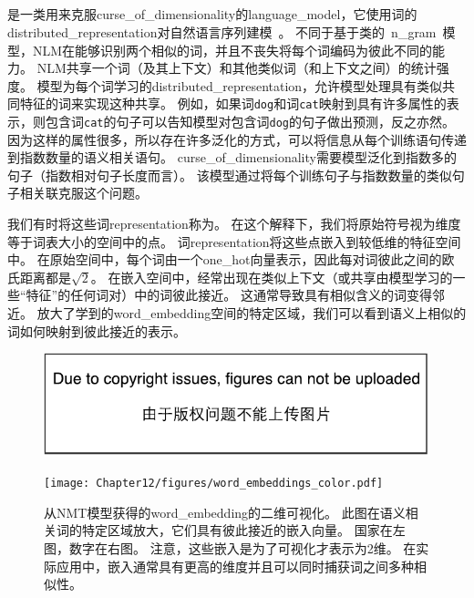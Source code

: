 \subsection{}
\label{sec:neural_language_models}

是一类用来克服\gls{curse_of_dimensionality}的\gls{language_model}，它使用词的\gls{distributed_representation}对自然语言序列建模~\citep{BenDucVin01-small}。
不同于基于类的~\gls{n_gram}~模型，\gls{NLM}在能够识别两个相似的词，并且不丧失将每个词编码为彼此不同的能力。
\gls{NLM}共享一个词（及其上下文）和其他类似词（和上下文之间）的统计强度。
模型为每个词学习的\gls{distributed_representation}，允许模型处理具有类似共同特征的词来实现这种共享。
例如，如果词{\tt dog}和词{\tt cat}映射到具有许多属性的表示，则包含词{\tt cat}的句子可以告知模型对包含词{\tt dog}的句子做出预测，反之亦然。
因为这样的属性很多，所以存在许多泛化的方式，可以将信息从每个训练语句传递到指数数量的语义相关语句。
\gls{curse_of_dimensionality}需要模型泛化到指数多的句子（指数相对句子长度而言）。
该模型通过将每个训练句子与指数数量的类似句子相关联克服这个问题。


我们有时将这些词\gls{representation}称为。
在这个解释下，我们将原始符号视为维度等于词表大小的空间中的点。
词\gls{representation}将这些点嵌入到较低维的特征空间中。
在原始空间中，每个词由一个\gls{one_hot}向量表示，因此每对词彼此之间的欧氏距离都是$\sqrt{2}$。
在嵌入空间中，经常出现在类似上下文（或共享由模型学习的一些``特征''的任何词对）中的词彼此接近。
这通常导致具有相似含义的词变得邻近。
放大了学到的\gls{word_embedding}空间的特定区域，我们可以看到语义上相似的词如何映射到彼此接近的表示。

\begin{figure}[htp]
\centering
\ifOpenSource
\centerline{\includegraphics{figure.pdf}}
\else
\texttt{[image: Chapter12/figures/word\_embeddings\_color.pdf]}
\fi
\caption{从\gls{NMT}模型获得的\gls{word_embedding}的二维可视化\citep{Bahdanau-et-al-ICLR2015-small}。
此图在语义相关词的特定区域放大，它们具有彼此接近的嵌入向量。
国家在左图，数字在右图。
注意，这些嵌入是为了可视化才表示为2维。
在实际应用中，嵌入通常具有更高的维度并且可以同时捕获词之间多种相似性。
}
\label{fig:chap12_word_embeddings_color}
\end{figure}

